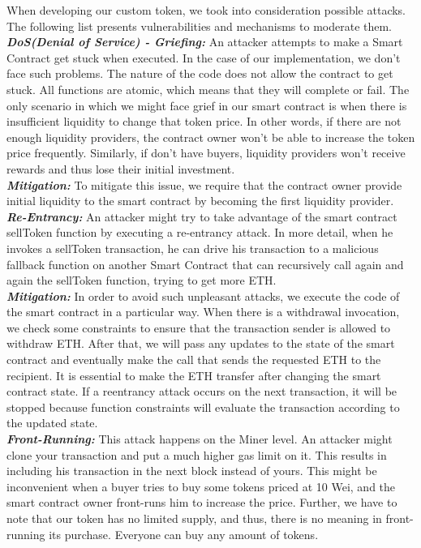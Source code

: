\documentclass[12pt,a4paper]{article}
\begin{document}
When developing our custom token, we took into consideration possible
attacks. The following list presents vulnerabilities and mechanisms to moderate
them. \\

\textbf{\emph{DoS(Denial of Service) - Griefing: }}An attacker attempts to make
a Smart Contract get stuck when executed. In the case of our implementation, we
don't face such problems. The nature of the code does not allow the contract to
get stuck. All functions are atomic, which means that they will complete or
fail. The only scenario in which we might face grief in our smart contract is
when there is insufficient liquidity to change that token price. In other words,
if there are not enough liquidity providers, the contract owner won't be able to
increase the token price frequently. Similarly, if don't have buyers, liquidity
providers won't receive rewards and thus lose their initial investment. \\

\textbf{\emph{Mitigation: }}To mitigate this issue, we require that the
contract owner provide initial liquidity to the smart contract by becoming the
first liquidity provider. \\

\textbf{\emph{Re-Entrancy: }}An attacker might try to take advantage of the
smart contract sellToken function by executing a re-entrancy attack. In more
detail, when he invokes a sellToken transaction, he can drive his transaction
to a malicious fallback function on another Smart Contract that can recursively
call again and again the sellToken function, trying to get more ETH.\\

\textbf{\emph{Mitigation: }}In order to avoid such unpleasant attacks, we
execute the code of the smart contract in a particular way. When there is a
withdrawal invocation, we check some constraints to ensure that the transaction
sender is allowed to withdraw ETH. After that, we will pass any updates to the
state of the smart contract and eventually make the call that sends the
requested ETH to the recipient. It is essential to make the ETH transfer after
changing the smart contract state. If a reentrancy attack occurs on the next
transaction, it will be stopped because function constraints will evaluate the
transaction according to the updated state.\\

\textbf{\emph{Front-Running: }} This attack happens on the Miner level. An
attacker might clone your transaction and put a much higher gas limit on it.
This results in including his transaction in the next block instead of yours.
This might be inconvenient when a buyer tries to buy some tokens priced at 10
Wei, and the smart contract owner front-runs him to increase the price. Further,
we have to note that our token has no limited supply, and thus, there is no
meaning in front-running its purchase. Everyone can buy any amount of tokens. \\
\end{document}
